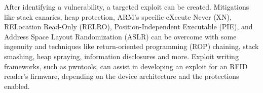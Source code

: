 After identifying a vulnerability, a targeted exploit can be created. Mitigations like stack canaries, heap protection, ARM's specific eXecute Never (XN), RELocation Read-Only (RELRO), Position-Independent Executable (PIE), and Address Space Layout Randomization (ASLR) can be overcome with some ingenuity and techniques like return-oriented programming (ROP) chaining, stack smashing, heap spraying, information disclosures and more. Exploit writing frameworks, such as pwntools, can assist in developing an exploit for an RFID reader's firmware, depending on the device architecture and the protections enabled.
